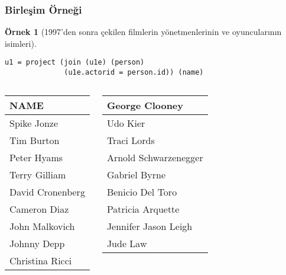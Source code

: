 \documentclass[dvipsnames]{beamer}
\theoremstyle{definition}
\theoremstyle{example}
\newtheorem{ornek}[theorem]{Örnek}
\theoremstyle{plain}
\begin{document}
\begin{frame}[fragile]
  \frametitle{Birleşim Örneği}

  \begin{ornek}[1997'den sonra çekilen filmlerin yönetmenlerinin ve
                oyuncularının isimleri]
    \begin{lstlisting}
u1 = project (join (u1e) (person)
              (u1e.actorid = person.id)) (name)
    \end{lstlisting}

    \pause
    \begin{columns}[b]
      \begin{tiny}
      \begin{table}
        \begin{tabular}{|l|}\hline
NAME                 \\\hline\hline
Spike Jonze          \\\hline
Tim Burton           \\\hline
Peter Hyams          \\\hline
Terry Gilliam        \\\hline
David Cronenberg     \\\hline
Cameron Diaz         \\\hline
John Malkovich       \\\hline
Johnny Depp          \\\hline
Christina Ricci      \\\hline
        \end{tabular}
      \end{table}
      \end{tiny}

      \begin{tiny}
      \begin{table}
        \begin{tabular}{|l|}\hline
George Clooney       \\\hline
Udo Kier             \\\hline
Traci Lords          \\\hline
Arnold Schwarzenegger\\\hline
Gabriel Byrne        \\\hline
Benicio Del Toro     \\\hline
Patricia Arquette    \\\hline
Jennifer Jason Leigh \\\hline
Jude Law             \\\hline
        \end{tabular}
      \end{table}
      \end{tiny}
    \end{columns}
  \end{ornek}
\end{frame}
\end{document}
